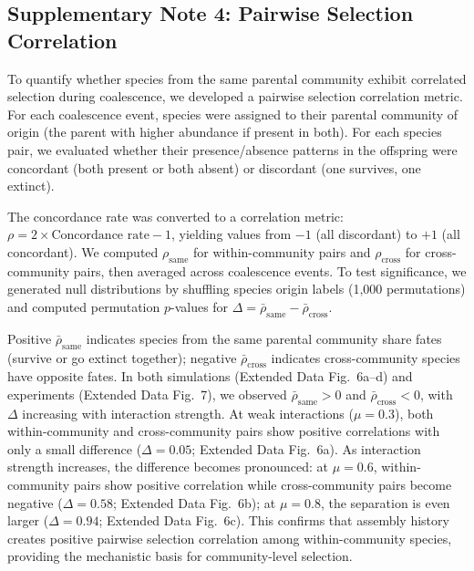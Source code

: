 \subsection*{Supplementary Note 4: Pairwise Selection Correlation}
\label{sec:suppl:note4}

To quantify whether species from the same parental community exhibit correlated selection during coalescence, we developed a pairwise selection correlation metric. For each coalescence event, species were assigned to their parental community of origin (the parent with higher abundance if present in both). For each species pair, we evaluated whether their presence/absence patterns in the offspring were concordant (both present or both absent) or discordant (one survives, one extinct).

The concordance rate was converted to a correlation metric: $\rho = 2 \times \text{Concordance rate} - 1$, yielding values from $-1$ (all discordant) to $+1$ (all concordant). We computed $\rho_{\text{same}}$ for within-community pairs and $\rho_{\text{cross}}$ for cross-community pairs, then averaged across coalescence events. To test significance, we generated null distributions by shuffling species origin labels (1,000 permutations) and computed permutation $p$-values for $\Delta = \bar{\rho}_{\text{same}} - \bar{\rho}_{\text{cross}}$.

Positive $\bar{\rho}_{\text{same}}$ indicates species from the same parental community share fates (survive or go extinct together); negative $\bar{\rho}_{\text{cross}}$ indicates cross-community species have opposite fates. In both simulations (Extended Data Fig.~6a--d) and experiments (Extended Data Fig.~7), we observed $\bar{\rho}_{\text{same}} > 0$ and $\bar{\rho}_{\text{cross}} < 0$, with $\Delta$ increasing with interaction strength. At weak interactions ($\mu = 0.3$), both within-community and cross-community pairs show positive correlations with only a small difference ($\Delta = 0.05$; Extended Data Fig.~6a). As interaction strength increases, the difference becomes pronounced: at $\mu = 0.6$, within-community pairs show positive correlation while cross-community pairs become negative ($\Delta = 0.58$; Extended Data Fig.~6b); at $\mu = 0.8$, the separation is even larger ($\Delta = 0.94$; Extended Data Fig.~6c). This confirms that assembly history creates positive pairwise selection correlation among within-community species, providing the mechanistic basis for community-level selection.

